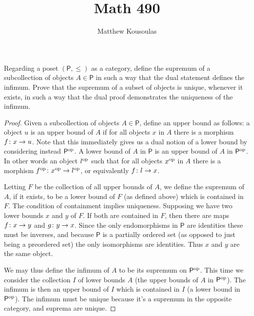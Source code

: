 \documentclass{article}
\title{Math 490}
\author{Matthew Kousoulas}
\renewcommand{\sP}{\mathsf{P}}
\begin{document}
\maketitle

\begin{exercise}
	Regarding a poset \((\sP,\le)\) as a category, define the supremum of a
	subcollection of objects \(A\in\sP\) in such a way that the dual
	statement defines the infimum. Prove that the supremum of a subset of
	objects is unique, whenever it exists, in such a way that the dual proof
	demonstrates the uniqueness of the infimum.
\end{exercise}
\begin{proof}
	Given a subcollection of objects \(A\in\sP\), define an upper bound as
	follows: a object \(u\) is an upper bound of \(A\) if for all objects \(x\)
	in \(A\) there is a morphism \({f}\colon{x}\to{u}\). Note that this immediately
	gives us a dual notion of a lower bound by considering instead
	\(\sP^\op\). A lower bound of \(A\) in \(\sP\) is an upper bound of \(A\) in
	\(\sP^\op\). In other words an object \(l^{\textrm{op}}\) such that for all objects
	\(x^{\textrm{op}}\) in \(A\) there is a morphism \({f^{\textrm{op}}}\colon{x^{\textrm{op}}}\to{l^{\textrm{op}}}\), or
	equivalently \({f}\colon{l}\to{x}\).

	Letting \(F\) be the collection of all upper bounds of \(A\), we define the
	supremum of \(A\), if it exists, to be a lower bound of \(F\) (as defined
	above) which is contained in \(F\). The condition of containment implies
	uniqueness. Supposing we have two lower bounds \(x\) and \(y\) of \(F\). If
	both are contained in \(F\), then there are maps \({f}\colon{x}\to{y}\) and
	\({g}\colon{y}\to{x}\). Since the only endomorphisms in \(\sP\) are identities
	these must be inverses, and because \(\sP\) is a partially ordered set (as
	opposed to just being a preordered set) the only isomorphisms are
	identities. Thus \(x\) and \(y\) are the same object.

	We may thus define the infimum of \(A\) to be its supremum on \(\sP^\op\).
	This time we consider the collection \(I\) of lower bounds \(A\) (the upper
	bounds of \(A\) in \(\sP^\op\)). The infimum is then an upper bound of \(I\)
	which is contained in \(I\) (a lower bound in \(\sP^\op\)). The infimum must
	be unique because it's a supremum in the opposite category, and suprema are
	unique.
\end{proof}
\end{document}
